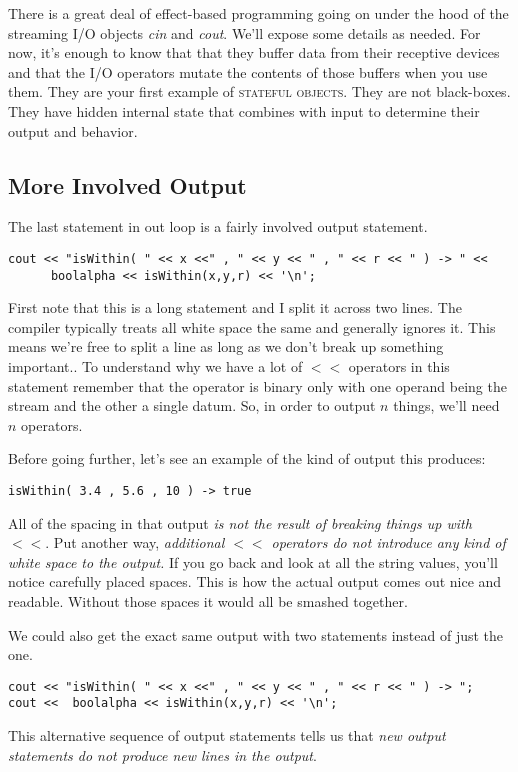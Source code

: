 \documentclass[]{tufte-handout}
\begin{document}
There is a great deal of effect-based programming going on under the hood of the streaming I/O objects \textit{cin} and \textit{cout}. We'll expose some details as needed. For now, it's enough to know that that they buffer data from their receptive devices and that the I/O operators mutate the contents of those buffers when you use them. They are your first example of \textsc{stateful objects}. They are not black-boxes. They have hidden internal state that combines with input to determine their output and behavior.

\subsection{More Involved Output}

The last statement in out loop is a fairly involved output statement.
\begin{verbatim}
cout << "isWithin( " << x <<" , " << y << " , " << r << " ) -> " <<
      boolalpha << isWithin(x,y,r) << '\n'; 
\end{verbatim}

First note that this is a long statement and I split it across two lines. The compiler typically treats all white space the same and generally ignores it. This means we're free to split a line as long as we don't break up something important.. To understand why we have a lot of $<<$ operators in this statement remember that the operator is binary only with one operand being the stream and the other a single datum. So, in order to output $n$ things, we'll need $n$ operators. 


Before going further, let's see an example of the kind of output this produces:
\begin{verbatim}
isWithin( 3.4 , 5.6 , 10 ) -> true
\end{verbatim}
All of the spacing in that output \textit{is not the result of breaking things up with $<<$}. Put another way, \textit{additional $<<$ operators do not introduce any kind of white space to the output.}  If you go back and look at all the string values, you'll notice carefully placed spaces. This is how the actual output comes out nice and readable. Without those spaces it would all be smashed together.

We could also get the exact same output with two statements instead of just the one.
\begin{verbatim}
cout << "isWithin( " << x <<" , " << y << " , " << r << " ) -> ";
cout <<  boolalpha << isWithin(x,y,r) << '\n'; 
\end{verbatim}
This alternative sequence of output statements tells us that \textit{new output statements do not produce new lines in the output}. 
\end{document}
